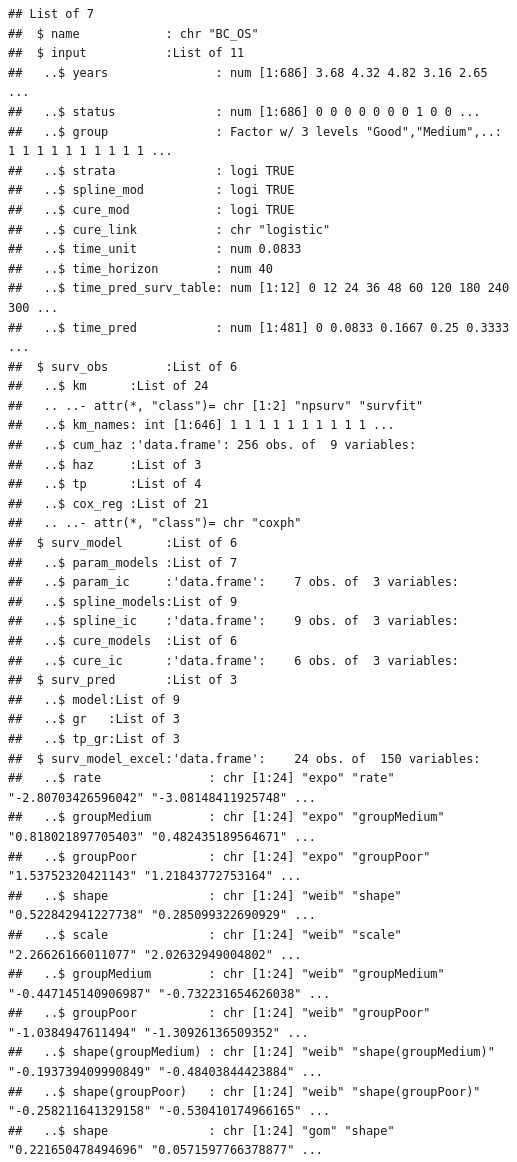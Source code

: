 \documentclass[
]{article}
\begin{document}
\begin{verbatim}
## List of 7
##  $ name            : chr "BC_OS"
##  $ input           :List of 11
##   ..$ years               : num [1:686] 3.68 4.32 4.82 3.16 2.65 ...
##   ..$ status              : num [1:686] 0 0 0 0 0 0 0 1 0 0 ...
##   ..$ group               : Factor w/ 3 levels "Good","Medium",..: 1 1 1 1 1 1 1 1 1 1 ...
##   ..$ strata              : logi TRUE
##   ..$ spline_mod          : logi TRUE
##   ..$ cure_mod            : logi TRUE
##   ..$ cure_link           : chr "logistic"
##   ..$ time_unit           : num 0.0833
##   ..$ time_horizon        : num 40
##   ..$ time_pred_surv_table: num [1:12] 0 12 24 36 48 60 120 180 240 300 ...
##   ..$ time_pred           : num [1:481] 0 0.0833 0.1667 0.25 0.3333 ...
##  $ surv_obs        :List of 6
##   ..$ km      :List of 24
##   .. ..- attr(*, "class")= chr [1:2] "npsurv" "survfit"
##   ..$ km_names: int [1:646] 1 1 1 1 1 1 1 1 1 1 ...
##   ..$ cum_haz :'data.frame': 256 obs. of  9 variables:
##   ..$ haz     :List of 3
##   ..$ tp      :List of 4
##   ..$ cox_reg :List of 21
##   .. ..- attr(*, "class")= chr "coxph"
##  $ surv_model      :List of 6
##   ..$ param_models :List of 7
##   ..$ param_ic     :'data.frame':    7 obs. of  3 variables:
##   ..$ spline_models:List of 9
##   ..$ spline_ic    :'data.frame':    9 obs. of  3 variables:
##   ..$ cure_models  :List of 6
##   ..$ cure_ic      :'data.frame':    6 obs. of  3 variables:
##  $ surv_pred       :List of 3
##   ..$ model:List of 9
##   ..$ gr   :List of 3
##   ..$ tp_gr:List of 3
##  $ surv_model_excel:'data.frame':    24 obs. of  150 variables:
##   ..$ rate               : chr [1:24] "expo" "rate" "-2.80703426596042" "-3.08148411925748" ...
##   ..$ groupMedium        : chr [1:24] "expo" "groupMedium" "0.818021897705403" "0.482435189564671" ...
##   ..$ groupPoor          : chr [1:24] "expo" "groupPoor" "1.53752320421143" "1.21843772753164" ...
##   ..$ shape              : chr [1:24] "weib" "shape" "0.522842941227738" "0.285099322690929" ...
##   ..$ scale              : chr [1:24] "weib" "scale" "2.26626166011077" "2.02632949004802" ...
##   ..$ groupMedium        : chr [1:24] "weib" "groupMedium" "-0.447145140906987" "-0.732231654626038" ...
##   ..$ groupPoor          : chr [1:24] "weib" "groupPoor" "-1.0384947611494" "-1.30926136509352" ...
##   ..$ shape(groupMedium) : chr [1:24] "weib" "shape(groupMedium)" "-0.193739409990849" "-0.48403844423884" ...
##   ..$ shape(groupPoor)   : chr [1:24] "weib" "shape(groupPoor)" "-0.258211641329158" "-0.530410174966165" ...
##   ..$ shape              : chr [1:24] "gom" "shape" "0.221650478494696" "0.0571597766378877" ...

\end{verbatim}
\end{document}
